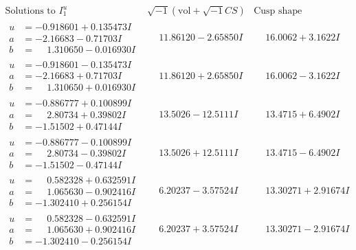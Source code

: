 \documentclass[1p]{elsarticle_modified}
\theoremstyle{definition}
\newcommand{\I}{\sqrt{-1}}
\begin{document}
$$\begin{array}{c|c|c}  
\text{Solutions to }I^u_{1}& \I (\text{vol} + \sqrt{-1}CS) & \text{Cusp shape}\\
 \hline 
\begin{aligned}
u &= -0.918601 + 0.135473 I \\
a &= -2.16683 - 0.71703 I \\
b &= \phantom{-}1.310650 - 0.016930 I\end{aligned}
 & \phantom{-}11.86120 - 2.65850 I & \phantom{-}16.0062 + 3.1622 I \\ \hline\begin{aligned}
u &= -0.918601 - 0.135473 I \\
a &= -2.16683 + 0.71703 I \\
b &= \phantom{-}1.310650 + 0.016930 I\end{aligned}
 & \phantom{-}11.86120 + 2.65850 I & \phantom{-}16.0062 - 3.1622 I \\ \hline\begin{aligned}
u &= -0.886777 + 0.100899 I \\
a &= \phantom{-}2.80734 + 0.39802 I \\
b &= -1.51502 + 0.47144 I\end{aligned}
 & \phantom{-}13.5026 - 12.5111 I & \phantom{-}13.4715 + 6.4902 I \\ \hline\begin{aligned}
u &= -0.886777 - 0.100899 I \\
a &= \phantom{-}2.80734 - 0.39802 I \\
b &= -1.51502 - 0.47144 I\end{aligned}
 & \phantom{-}13.5026 + 12.5111 I & \phantom{-}13.4715 - 6.4902 I \\ \hline\begin{aligned}
u &= \phantom{-}0.582328 + 0.632591 I \\
a &= \phantom{-}1.065630 - 0.902416 I \\
b &= -1.302410 + 0.256154 I\end{aligned}
 & \phantom{-}6.20237 - 3.57524 I & \phantom{-}13.30271 + 2.91674 I \\ \hline\begin{aligned}
u &= \phantom{-}0.582328 - 0.632591 I \\
a &= \phantom{-}1.065630 + 0.902416 I \\
b &= -1.302410 - 0.256154 I\end{aligned}
 & \phantom{-}6.20237 + 3.57524 I & \phantom{-}13.30271 - 2.91674 I \\ \hline\begin{aligned}

\end{aligned}
\end{array}$$
\end{document}
